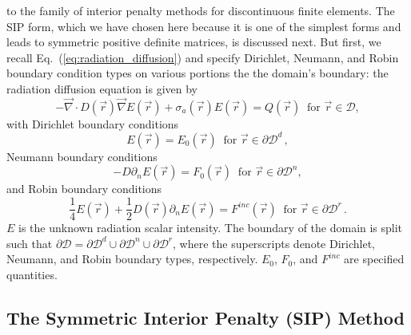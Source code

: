 \documentclass[preprint,10pt]{elsarticle}
\renewcommand{\div}{\vec{\nabla}\! \cdot \!}
\newcommand{\grad}{\vec{\nabla}}
\newcommand{\D}{\mathcal{D}}
\newcommand{\vr}{\vec{r}}
\newcommand{\eqt}[1]{Eq.~(\ref{#1})}                     %
\begin{document}
to the family of interior penalty methods for discontinuous finite elements. The SIP form,
which we have chosen here because it is one of the simplest forms and leads to symmetric 
positive definite matrices, is discussed next. 
%
But first, we recall \eqt{eq:radiation_diffusion} and specify 
Dirichlet, Neumann, and Robin boundary condition types on various portions the the domain's
boundary: the radiation diffusion equation is given by
\begin{equation}
  -\div D(\vr) \grad E(\vr) + \sigma_a(\vr) E(\vr) = Q(\vr)\ \textrm{ for } \vr \in \D,
\end{equation}
with Dirichlet boundary conditions
\begin{equation}
  E(\vr)  = E_0(\vr)\ \textrm{ for } \vr \in  \partial \D^d \, ,
\end{equation}
Neumann boundary conditions
\begin{equation}
  -D \partial_n E(\vr) = F_0(\vr) \ \textrm{ for } \vr \in \partial \D^n,
\end{equation}
and Robin boundary conditions
\begin{equation}
  \frac{1}{4}E(\vr) + \frac{1}{2} D(\vr) \partial_n E(\vr) = F^{inc}(\vr) \ \textrm{ for } \vr \in  \partial \D^r \, .
\end{equation}
%
$E$ is the unknown radiation scalar intensity. The boundary of the domain is split such that
$\partial \D = \partial \D^d \cup \partial \D^n \cup \partial \D^r$,  where the superscripts
denote Dirichlet, Neumann, and Robin boundary types, respectively. $E_0$, $F_0$, and $F^{inc}$ are specified
quantities. 


\subsection{The Symmetric Interior Penalty (SIP) Method}
\end{document}

